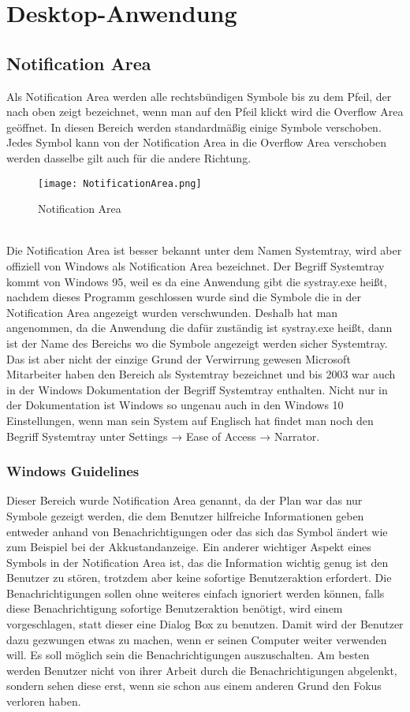 \chapter{Desktop-Anwendung}
\label{chap:DesktopAnwendung}

\section{Notification Area}
Als Notification Area werden alle rechtsbündigen Symbole bis zu dem Pfeil, der nach oben zeigt bezeichnet, wenn man auf den Pfeil klickt wird die Overflow Area geöffnet. In diesen Bereich werden standardmäßig einige Symbole verschoben. Jedes Symbol kann von der Notification Area in die Overflow Area verschoben werden dasselbe gilt auch für die andere Richtung. 
\begin{figure}[H]
    \centering
    \texttt{[image: NotificationArea.png]}
    \caption[NotificationArea]{Notification Area} 
\end{figure}
\  \\
Die Notification Area ist besser bekannt unter dem Namen Systemtray, wird aber offiziell von Windows als Notification Area bezeichnet. Der Begriff Systemtray kommt von Windows 95, weil es da eine Anwendung gibt die systray.exe heißt, nachdem dieses Programm geschlossen wurde sind die Symbole die in der Notification Area angezeigt wurden verschwunden. Deshalb hat man angenommen, da die Anwendung die dafür zuständig ist systray.exe heißt, dann ist der Name des Bereichs wo die Symbole angezeigt werden sicher Systemtray. Das ist aber nicht der einzige Grund der Verwirrung gewesen Microsoft Mitarbeiter haben den Bereich als Systemtray bezeichnet und bis 2003 war auch in der Windows Dokumentation der Begriff Systemtray enthalten. Nicht nur in der Dokumentation ist Windows so ungenau auch in den Windows 10 Einstellungen, wenn man sein System auf Englisch hat findet man noch den Begriff Systemtray unter Settings → Ease of Access → Narrator.

\subsection{Windows Guidelines}
Dieser Bereich wurde Notification Area genannt, da der Plan war das nur Symbole gezeigt werden, die dem Benutzer hilfreiche Informationen geben entweder anhand von Benachrichtigungen oder das sich das Symbol ändert wie zum Beispiel bei der Akkustandanzeige. Ein anderer wichtiger Aspekt eines Symbols in der Notification Area ist, das die Information wichtig genug ist den Benutzer zu stören, trotzdem aber keine sofortige  Benutzeraktion erfordert. Die Benachrichtigungen sollen ohne weiteres einfach ignoriert werden können, falls diese Benachrichtigung sofortige Benutzeraktion benötigt, wird einem vorgeschlagen, statt dieser eine Dialog Box zu benutzen. Damit wird der Benutzer dazu gezwungen etwas zu machen, wenn er seinen Computer weiter verwenden will. Es soll möglich sein die Benachrichtigungen auszuschalten. Am besten werden Benutzer nicht von ihrer Arbeit durch die Benachrichtigungen abgelenkt, sondern sehen diese erst, wenn sie schon aus einem anderen Grund den Fokus verloren haben. 

